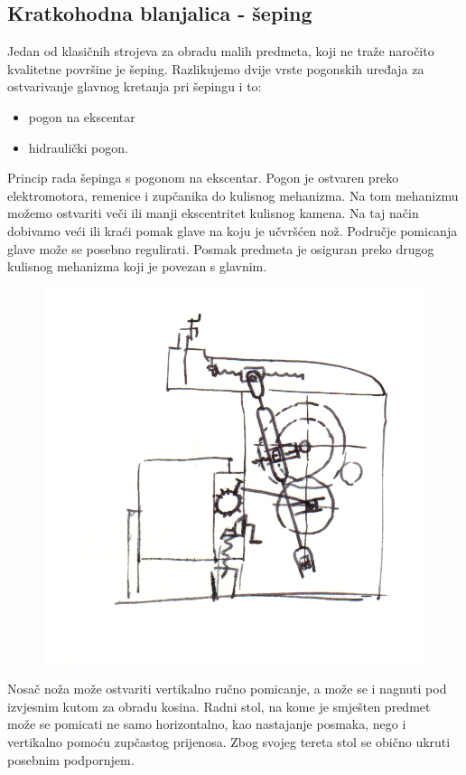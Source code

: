 \documentclass[a4paper,12pt]{article}
\numberwithin{figure}{section}
\begin{document}
\subsection{Kratkohodna blanjalica - šeping}
Jedan od klasičnih strojeva za obradu malih predmeta, koji ne traže naročito kvalitetne površine je šeping. Razlikujemo dvije vrste pogonskih uređaja za ostvarivanje glavnog kretanja pri šepingu i to:
\begin{itemize}
\item pogon na ekscentar
\item hidraulički pogon.
\end{itemize}
Princip rada šepinga s pogonom na ekscentar. Pogon je  ostvaren preko elektromotora, remenice i zupčanika do kulisnog mehanizma. Na tom mehanizmu možemo ostvariti veči ili manji ekscentritet kulisnog kamena. Na taj način dobivamo veći ili kraći pomak glave na koju je učvršćen nož. Područje pomicanja glave može se posebno regulirati. Posmak predmeta je osiguran preko drugog kulisnog mehanizma koji je povezan s glavnim.
\begin{figure}[!h]
\centering
\includegraphics[scale=0.15]{image_15-1.png}
\end{figure}
\FloatBarrier
Nosač noža može ostvariti vertikalno ručno pomicanje, a može se i nagnuti pod izvjesnim kutom za obradu kosina. Radni stol, na kome je smješten predmet može se pomicati ne samo horizontalno, kao nastajanje posmaka, nego i vertikalno pomoću zupčastog prijenosa. Zbog svojeg tereta stol se obično ukruti posebnim podpornjem. 
\end{document}
